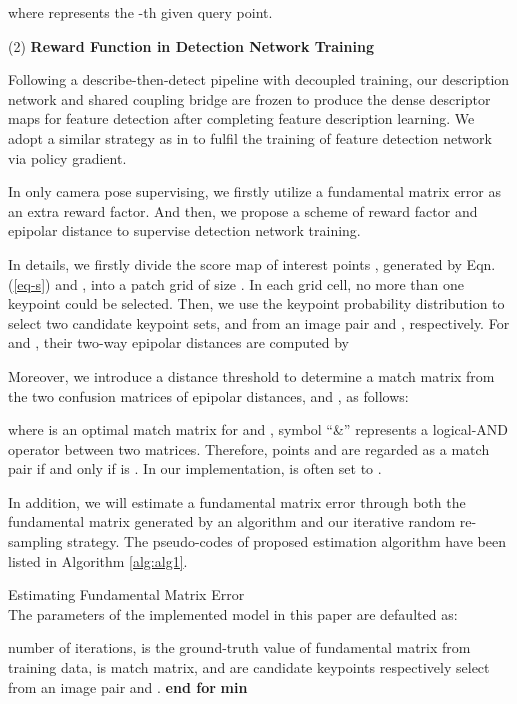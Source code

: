 \documentclass[journal]{IEEEtran}
\begin{document}
where  represents the -th given query point.



(2) \textbf{Reward Function in Detection Network Training}

Following a describe-then-detect pipeline with decoupled training, our description network and shared coupling bridge are frozen to produce the dense descriptor maps for feature detection after completing feature description learning. We adopt a similar strategy as in \cite{disk,li2022decoupling} to fulfil the training of feature detection network via policy gradient.

In only camera pose supervising, 
we firstly utilize a fundamental matrix error as an extra reward factor. And then, we propose a scheme of reward factor and epipolar distance to supervise detection network training.

In details, we firstly divide the score map of interest points , generated by Eqn. (\ref{eq-s}) and , into a patch grid of size . In each grid cell, no more than one keypoint could be selected. Then, we use the keypoint probability distribution to select two candidate keypoint sets,  and  from an image pair  and , respectively. For  and , their two-way epipolar distances are computed by



Moreover, we introduce a distance threshold  to determine a match matrix from the two confusion matrices of epipolar distances,  and , as follows:

where  is an optimal match matrix for  and , symbol ``\&'' represents a logical-AND operator between two matrices.
Therefore, points  and  are regarded as a match pair if and only if  is . In our implementation,  is often set to . 

In addition, we will estimate a fundamental matrix error through both the fundamental matrix generated by an  algorithm \cite{Hartley2004} and our iterative random re-sampling strategy. The pseudo-codes of proposed estimation algorithm have been listed in Algorithm \ref{alg:alg1}.

\begin{algorithm}[t]
\caption{Estimating Fundamental Matrix Error \protect\\
The parameters of the implemented model in this paper are defaulted as: }\label{alg:alg1}
\begin{algorithmic}[1]
\REQUIRE  number of iterations,  is the ground-truth value of fundamental matrix from training data,  is match matrix,  and  are candidate keypoints respectively select from an image pair  and .
\STATE 
\STATE 
\STATE 
\STATE 
\STATE 
\STATE 
\STATE \hspace{0.5cm}
\STATE \hspace{0.5cm}
\STATE \hspace{0.5cm}
\STATE \hspace{0.5cm}
\STATE \hspace{0.5cm}
\STATE \hspace{0.5cm}
\STATE \textbf{end for}
\RETURN \textbf{min}
\end{algorithmic}
\label{alg1}
\end{algorithm}
\end{document}

